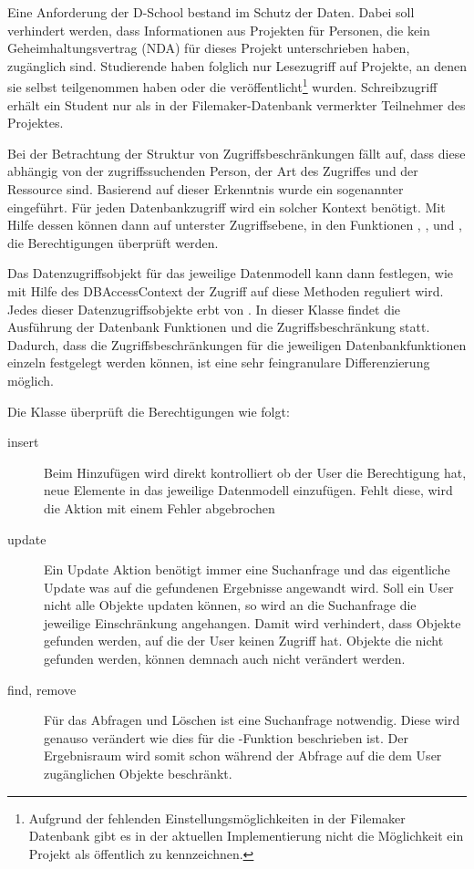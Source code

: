 Eine Anforderung der D-School bestand im Schutz der Daten. Dabei soll verhindert werden, dass Informationen aus Projekten für Personen, die kein Geheimhaltungsvertrag (NDA) für dieses Projekt unterschrieben haben, zugänglich sind. Studierende haben folglich nur Lesezugriff auf Projekte, an denen sie selbst teilgenommen haben oder die veröffentlicht\footnote{Aufgrund der fehlenden Einstellungsmöglichkeiten in der Filemaker Datenbank gibt es in der aktuellen Implementierung nicht die Möglichkeit ein Projekt als öffentlich zu kennzeichnen.} wurden. Schreibzugriff erhält ein Student nur als in der Filemaker-Datenbank vermerkter Teilnehmer des Projektes.

Bei der Betrachtung der Struktur von Zugriffsbeschränkungen fällt auf, dass diese abhängig von der zugriffssuchenden Person, der Art des Zugriffes und der Ressource sind. Basierend auf dieser Erkenntnis wurde ein sogenannter  eingeführt. Für jeden Datenbankzugriff wird ein solcher Kontext benötigt. Mit Hilfe dessen können dann auf unterster Zugriffsebene, in den Funktionen , ,  und , die Berechtigungen überprüft werden.

Das Datenzugriffsobjekt für das jeweilige Datenmodell kann dann festlegen, wie mit Hilfe des DBAccessContext der Zugriff auf diese Methoden reguliert wird. Jedes dieser Datenzugriffsobjekte erbt von . In dieser Klasse findet die Ausführung der Datenbank Funktionen und die Zugriffsbeschränkung statt. Dadurch, dass die Zugriffsbeschränkungen für die jeweiligen Datenbankfunktionen einzeln festgelegt werden können, ist eine sehr feingranulare Differenzierung möglich.

Die Klasse  überprüft die Berechtigungen wie folgt:
\begin{description}
\item[insert] Beim Hinzufügen wird direkt kontrolliert ob der User die Berechtigung hat, neue Elemente in das jeweilige Datenmodell einzufügen. Fehlt diese, wird die Aktion mit einem Fehler abgebrochen
\item[update] Ein Update Aktion benötigt immer eine Suchanfrage und das eigentliche Update was auf die gefundenen Ergebnisse angewandt wird. Soll ein User nicht alle Objekte updaten können, so wird an die Suchanfrage die jeweilige Einschränkung angehangen. Damit wird verhindert, dass Objekte gefunden werden, auf die der User keinen Zugriff hat. Objekte die nicht gefunden werden, können demnach auch nicht verändert werden.
\item[find, remove] Für das Abfragen und Löschen ist eine Suchanfrage notwendig. Diese wird genauso verändert wie dies für die -Funktion beschrieben ist. Der Ergebnisraum wird somit schon während der Abfrage auf die dem User zugänglichen Objekte beschränkt.
\end{description}
